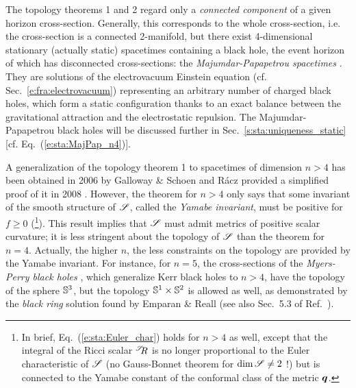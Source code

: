 \begin{remark}
\label{r:sta:Majumdar_Papapetrou}
The topology theorems 1 and 2 regard only
a \emph{connected component} of a given horizon cross-section.
Generally, this corresponds to the whole cross-section, i.e. the cross-section
is a connected 2-manifold, but there exist
4-dimensional stationary (actually static) spacetimes containing a black hole,
the event horizon of which has
disconnected cross-sections: the
\emph{Majumdar-Papapetrou spacetimes}
\cite{Majum47,Papap47,HartlH72}. They are solutions of the
electrovacuum Einstein equation (cf. Sec.~\ref{e:fra:electrovacuum})
representing an arbitrary number of charged black holes,
which form a static configuration thanks to
an exact balance between the gravitational
attraction and the electrostatic repulsion. The Majumdar-Papapetrou black holes will be discussed
further in Sec.~\ref{s:sta:uniqueness_static} [cf. Eq.~(\ref{e:sta:MajPap_n4})].
\end{remark}

A generalization of the topology theorem 1 to spacetimes of
dimension $n>4$ has been obtained in 2006 by Galloway \& Schoen \cite{GalloS06}
and R\'acz provided a simplified
proof of it in 2008 \cite{Racz08}.
However, the theorem for $n>4$ only says that some invariant
of the smooth structure of $\mathscr{S}$, called the
\emph{Yamabe invariant}, must be positive for
$f \geq 0$ (\footnote{In brief, Eq.~(\ref{e:sta:Euler_char}) holds for $n>4$
as well, except that the integral of the Ricci scalar ${}^{\mathscr{S}}\!\!R$ is no longer
proportional to the Euler characteristic of $\mathscr{S}$ (no Gauss-Bonnet theorem for $\mathrm{dim}\, \mathscr{S} \neq 2$ !) but is connected to the Yamabe constant of the conformal class of the metric $\bm{q}$.}). This result implies that $\mathscr{S}$ must admit metrics of positive scalar curvature; it is
less stringent about the topology of $\mathscr{S}$ than the theorem for $n=4$.
Actually, the higher $n$, the less constraints on
the topology are provided by the Yamabe invariant. For instance,
for $n=5$, the cross-sections of the \emph{Myers-Perry black holes} \cite{MyersP86,EmparR08,Reall14}, which generalize
Kerr black holes to $n>4$, have the
topology of the sphere $\mathbb{S}^3$, but the topology
$\mathbb{S}^1\times\mathbb{S}^2$ is allowed as well, as demonstrated
by the \emph{black ring} solution found by Emparan \& Reall \cite{EmparR02,EmparR08,Reall14} (see also Sec.~5.3 of Ref.~\cite{Chrus20}).


